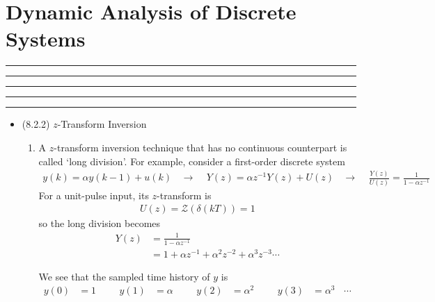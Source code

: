 \setcounter{chapter}{7}
\setcounter{section}{1}
\section{Dynamic Analysis of Discrete Systems}
\vspace{-8pt} \hrule \hrule \hrule \hrule \hrule  \vspace{12pt}
\begin{itemize}
\item (8.2.2) $z$-Transform Inversion
	\begin{enumerate}


		\item A $z$-transform inversion technique that has no continuous counterpart is called `long division'. For example, consider a first-order discrete system 
		\begin{align*}
			y(k) = \alpha y(k-1) + u(k) ~~~~\rightarrow~~~~~ Y(z) = \alpha z^{-1}Y(z)+U(z)  ~~~~\rightarrow~~~~~  \frac{Y(z)}{U(z)} = \frac{1}{1-\alpha z^{-1}}
		\end{align*} 
		For a unit-pulse input, its $z$-transform is 
		\begin{align*}
			U(z) = \mathcal{Z}(\delta(kT)) = 1 
		\end{align*}
		so the long division becomes 
		\begin{align*}
			Y(z) &= \frac{1}{1-\alpha z^{-1}} \\
			&= 1 + \alpha z^{-1} + \alpha^2 z^{-2} + \alpha^3 z^{-3}  \cdots  		
		\end{align*}

		We see that the sampled time history of $y$ is
		\begin{align*}
			y(0) &= 1 &&& y(1) &= \alpha &&& y(2) &= \alpha^2 &&& y(3) &= \alpha^3 ~~~~\cdots 
		\end{align*}
	\end{enumerate}		
\end{itemize}